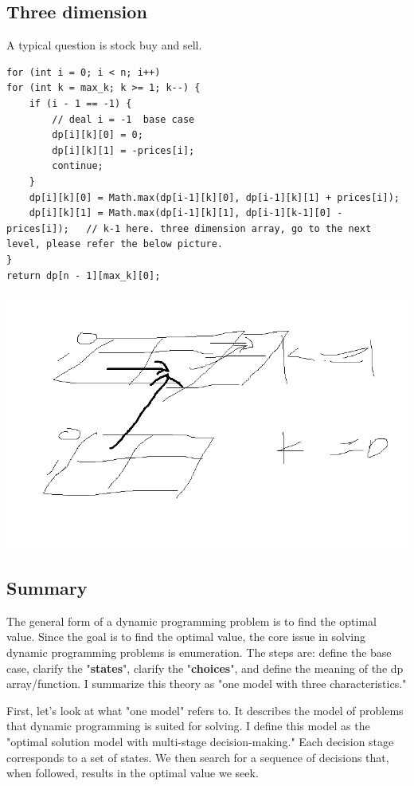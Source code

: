 \documentclass[a4paper,11pt,twoside]{book}
\begin{document}
\subsection{Three dimension}
	\par A typical question is stock buy and sell. 
\begin{lstlisting}
for (int i = 0; i < n; i++) 
for (int k = max_k; k >= 1; k--) {
	if (i - 1 == -1) {
		// deal i = -1  base case
		dp[i][k][0] = 0;
		dp[i][k][1] = -prices[i];
		continue;
	}
	dp[i][k][0] = Math.max(dp[i-1][k][0], dp[i-1][k][1] + prices[i]);
	dp[i][k][1] = Math.max(dp[i-1][k][1], dp[i-1][k-1][0] - prices[i]);   // k-1 here. three dimension array, go to the next level, please refer the below picture.
}
return dp[n - 1][max_k][0];	
\end{lstlisting}	
	
\begin{center}
	\includegraphics[width=0.5\linewidth]{pics/stock.png} 
\end{center}
	

\subsection{Summary}


	\par The general form of a dynamic programming problem is to find the optimal value. Since the goal is to find the optimal value, the core issue in solving dynamic programming problems is enumeration. The steps are: define the base case, clarify the "\textbf{states}", clarify the "\textbf{choices}", and define the meaning of the dp array/function. I summarize this theory as "one model with three characteristics."
	
	\par First, let's look at what "one model" refers to. It describes the model of problems that dynamic programming is suited for solving. I define this model as the "optimal solution model with multi-stage decision-making." Each decision stage corresponds to a set of states. We then search for a sequence of decisions that, when followed, results in the optimal value we seek.
	
\end{document}
